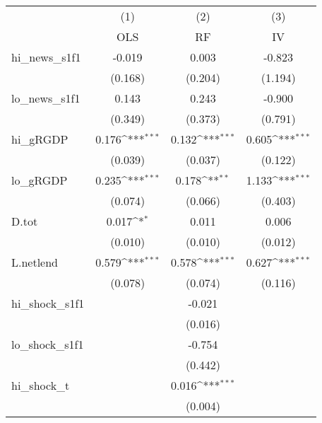 {
\def\sym#1{\ifmmode^{#1}\else\(^{#1}\)\fi}
\begin{tabular}{l*{3}{c}}
\toprule
            &\multicolumn{1}{c}{(1)}&\multicolumn{1}{c}{(2)}&\multicolumn{1}{c}{(3)}\\
            &\multicolumn{1}{c}{OLS}&\multicolumn{1}{c}{RF}&\multicolumn{1}{c}{IV}\\
\midrule
hi\_news\_s1f1&      -0.019         &       0.003         &      -0.823         \\
            &     (0.168)         &     (0.204)         &     (1.194)         \\
\addlinespace
lo\_news\_s1f1&       0.143         &       0.243         &      -0.900         \\
            &     (0.349)         &     (0.373)         &     (0.791)         \\
\addlinespace
hi\_gRGDP    &       0.176\sym{***}&       0.132\sym{***}&       0.605\sym{***}\\
            &     (0.039)         &     (0.037)         &     (0.122)         \\
\addlinespace
lo\_gRGDP    &       0.235\sym{***}&       0.178\sym{**} &       1.133\sym{***}\\
            &     (0.074)         &     (0.066)         &     (0.403)         \\
\addlinespace
D.tot       &       0.017\sym{*}  &       0.011         &       0.006         \\
            &     (0.010)         &     (0.010)         &     (0.012)         \\
\addlinespace
L.netlend   &       0.579\sym{***}&       0.578\sym{***}&       0.627\sym{***}\\
            &     (0.078)         &     (0.074)         &     (0.116)         \\
\addlinespace
hi\_shock\_s1f1&                     &      -0.021         &                     \\
            &                     &     (0.016)         &                     \\
\addlinespace
lo\_shock\_s1f1&                     &      -0.754         &                     \\
            &                     &     (0.442)         &                     \\
\addlinespace
hi\_shock\_t  &                     &       0.016\sym{***}&                     \\
            &                     &     (0.004)         &                     \\

\end{tabular}}
